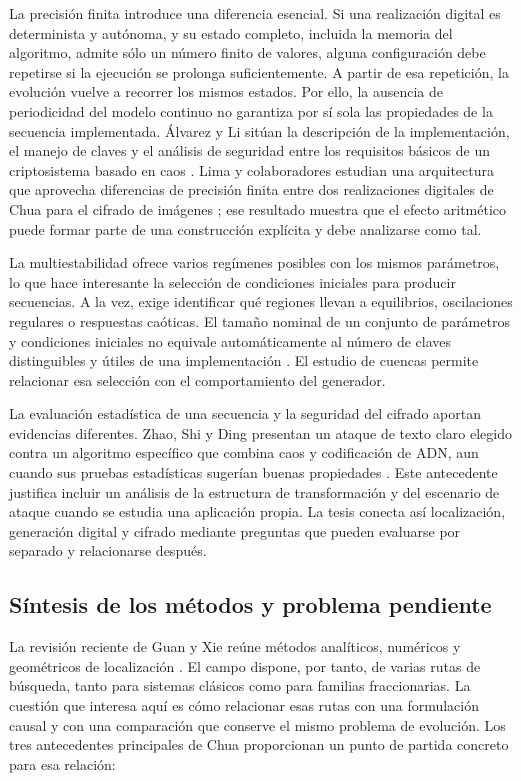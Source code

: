 La precisión finita introduce una diferencia esencial. Si una realización
digital es determinista y autónoma, y su estado completo, incluida la
memoria del algoritmo, admite sólo un número finito de valores, alguna
configuración debe repetirse si la ejecución se prolonga suficientemente.
A partir de esa repetición, la evolución vuelve a recorrer los mismos
estados. Por ello, la ausencia de periodicidad del modelo continuo no
garantiza por sí sola las propiedades de la secuencia implementada.
Álvarez y Li sitúan la descripción de la implementación, el manejo de claves
y el análisis de seguridad entre los requisitos básicos de un criptosistema
basado en caos \cite{Alvarez2006_3e24c}. Lima y colaboradores estudian una
arquitectura que aprovecha diferencias de precisión finita entre dos
realizaciones digitales de Chua para el cifrado de imágenes
\cite{Lima2025_99c51}; ese resultado muestra que el efecto aritmético puede
formar parte de una construcción explícita y debe analizarse como tal.

La multiestabilidad ofrece varios regímenes posibles con los mismos
parámetros, lo que hace interesante la selección de condiciones iniciales
para producir secuencias. A la vez, exige identificar qué regiones llevan
a equilibrios, oscilaciones regulares o respuestas caóticas. El tamaño
nominal de un conjunto de parámetros y condiciones iniciales no equivale
automáticamente al número de claves distinguibles y útiles de una
implementación \cite{Alvarez2006_3e24c}. El estudio de cuencas permite
relacionar esa selección con el comportamiento del generador.

La evaluación estadística de una secuencia y la seguridad del cifrado
aportan evidencias diferentes. Zhao, Shi y Ding presentan un ataque de
texto claro elegido contra un algoritmo específico que combina caos y
codificación de ADN, aun cuando sus pruebas estadísticas sugerían buenas
propiedades \cite{Zhao2025_98e42}. Este antecedente justifica incluir
un análisis de la estructura de transformación y del escenario de ataque
cuando se estudia una aplicación propia. La tesis conecta así localización,
generación digital y cifrado mediante preguntas que pueden evaluarse
por separado y relacionarse después.

\subsection{Síntesis de los métodos y problema pendiente}

La revisión reciente de Guan y Xie reúne métodos analíticos, numéricos y
geométricos de localización \cite{GuanXie2025}. El campo dispone, por tanto,
de varias rutas de búsqueda, tanto para sistemas clásicos como para
familias fraccionarias. La cuestión que interesa aquí es cómo relacionar
esas rutas con una formulación causal y con una comparación que conserve
el mismo problema de evolución. Los tres antecedentes principales de
Chua proporcionan un punto de partida concreto para esa relación:

